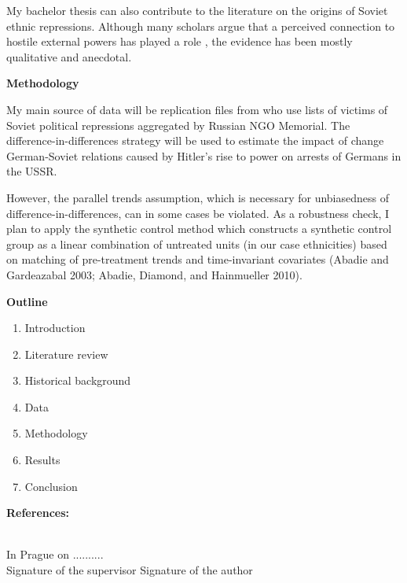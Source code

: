 My bachelor thesis can also contribute to the literature on the origins of Soviet ethnic repressions. Although many scholars argue that a perceived connection to hostile external powers has played a role \citep{martin_origins_1998, polian_against_2003}, the evidence has been mostly qualitative and anecdotal. 

\noindent \large{\bf Methodology}

\noindent My main source of data will be replication files from \citet{zhukov_stalins_2018} who use lists of victims of Soviet political repressions aggregated by Russian NGO Memorial. The difference-in-differences strategy will be used to estimate the impact of change German-Soviet relations caused by Hitler’s rise to power on arrests of Germans in the USSR. 

However, the parallel trends assumption, which is necessary for unbiasedness of difference-in-differences, can in some cases be violated. As a robustness check, I plan to apply the synthetic control method which constructs a synthetic control group as a linear combination of untreated units (in our case ethnicities) based on matching of pre-treatment trends and time-invariant covariates %
(Abadie and Gardeazabal 2003; Abadie, Diamond, and Hainmueller 2010). 

\noindent \large{\bf  Outline}
\begin{enumerate}
\item Introduction
 \item Literature review 
 \item Historical background
 \item Data
 \item Methodology
 \item Results
 \item Conclusion 
\end{enumerate}
\medskip
\large{\bf References:}
\printbibliography[keyword=major, heading=none]

\vspace{15mm}\\
In Prague on ..........\newline \\
Signature of the supervisor \hspace{30mm} Signature of the author
